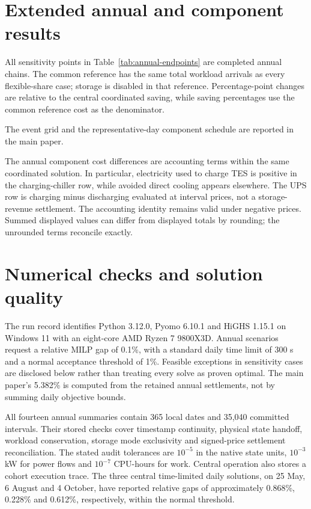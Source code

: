 \section{Extended annual and component results}
All sensitivity points in Table~\ref{tab:annual-endpoints} are completed annual chains. The common reference has the same total workload arrivals as every flexible-share case; storage is disabled in that reference. Percentage-point changes are relative to the central coordinated saving, while saving percentages use the common reference cost \textcolor{LatestGreen}{as the denominator}.


The event grid and the representative-day component schedule are reported in the main paper.

The annual \textcolor{LatestGreen}{component cost} differences are accounting terms within the same coordinated solution. In particular, electricity used to charge TES is positive in the charging-chiller row, while avoided direct cooling appears elsewhere. The UPS row is charging minus discharging evaluated at interval prices, not a storage-revenue settlement. The accounting identity remains valid under negative prices. Summed displayed values can differ from displayed totals by rounding; the unrounded terms reconcile exactly.

\section{Numerical checks and solution quality}
The run record identifies Python 3.12.0, Pyomo 6.10.1 and \textcolor{LatestGreen}{HiGHS 1.15.1 on Windows} 11 with an eight-core AMD Ryzen 7 9800X3D. Annual scenarios request a relative MILP gap of 0.1\%, with a standard daily time limit of 300 s and a normal acceptance threshold of 1\%. Feasible exceptions in sensitivity cases are disclosed below rather than treating every solve as proven optimal. The main paper's 5.382\% is computed from the retained annual settlements, not by summing daily objective bounds.

All fourteen annual summaries contain 365 local dates and 35,040 committed intervals. Their stored checks cover timestamp continuity, physical state handoff, workload conservation, storage mode exclusivity and signed-price settlement reconciliation. The stated audit tolerances are $10^{-5}$ in the native state units, $10^{-3}$ kW for power flows and $10^{-7}$ CPU-hours for work. Central operation also stores a cohort execution trace. The three central time-limited daily solutions, on 25 May, 6 August and 4 October, have reported relative gaps of approximately 0.868\%, 0.228\% and 0.612\%, respectively, within the normal threshold.

